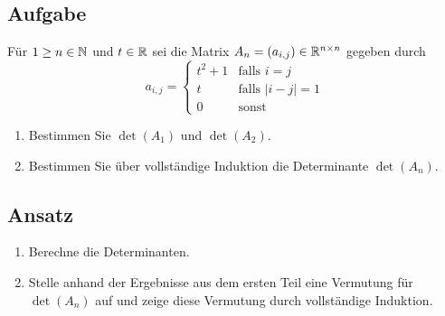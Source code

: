 \subsection{Aufgabe}
Für \( 1 \geq n \in \mathbb{N} \) und \( t \in \mathbb{R} \) sei die Matrix \( A_n = (a_{i,j}) \in \mathbb{R}^{n \times n} \) gegeben durch
\begin{equation*}
	a_{i,j} = \begin{cases}
		t^2+1 &\text{falls } i = j \\
		t &\text{falls } |i-j| = 1 \\
		0 &\text{sonst}
	\end{cases}
\end{equation*}
\begin{enumerate}
	\item Bestimmen Sie \( \det(A_1) \) und \( \det(A_2) \).
	\item Bestimmen Sie über vollständige Induktion die Determinante \( \det(A_n) \). 
\end{enumerate}

\subsection{Ansatz}
\begin{enumerate}
	\item Berechne die Determinanten.
	\item Stelle anhand der Ergebnisse aus dem ersten Teil eine Vermutung für \( \det(A_n) \) auf und zeige diese Vermutung durch vollständige Induktion. 
\end{enumerate}

